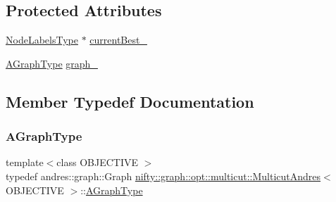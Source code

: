 \subsection*{Protected Attributes}
\begin{DoxyCompactItemize}
\item 
\hyperlink{classnifty_1_1graph_1_1opt_1_1multicut_1_1MulticutAndres_a6cd9d64abc4a98aa9745ce1ef0d4ecfe}{Node\+Labels\+Type} $\ast$ \hyperlink{classnifty_1_1graph_1_1opt_1_1multicut_1_1MulticutAndres_adaecc32ca442b03bf2a2f31ba7e14005}{current\+Best\+\_\+}
\item 
\hyperlink{classnifty_1_1graph_1_1opt_1_1multicut_1_1MulticutAndres_a0d2a06934455d278149370b1dbcb3953}{A\+Graph\+Type} \hyperlink{classnifty_1_1graph_1_1opt_1_1multicut_1_1MulticutAndres_a49623d993a1fdb16d8d0ba35f974c35a}{graph\+\_\+}
\end{DoxyCompactItemize}


\subsection{Member Typedef Documentation}
\mbox{\label{classnifty_1_1graph_1_1opt_1_1multicut_1_1MulticutAndres_a0d2a06934455d278149370b1dbcb3953}} 
\subsubsection{\texorpdfstring{A\+Graph\+Type}{AGraphType}}
{\footnotesize\ttfamily template$<$class O\+B\+J\+E\+C\+T\+I\+VE $>$ \\
typedef andres\+::graph\+::\+Graph \hyperlink{classnifty_1_1graph_1_1opt_1_1multicut_1_1MulticutAndres}{nifty\+::graph\+::opt\+::multicut\+::\+Multicut\+Andres}$<$ O\+B\+J\+E\+C\+T\+I\+VE $>$\+::\hyperlink{classnifty_1_1graph_1_1opt_1_1multicut_1_1MulticutAndres_a0d2a06934455d278149370b1dbcb3953}{A\+Graph\+Type}}

\mbox{\label{classnifty_1_1graph_1_1opt_1_1multicut_1_1MulticutAndres_ad9aa4942dd45186f3a2ebb38d42876e5}} 
